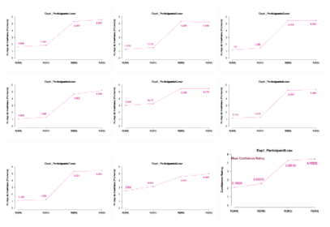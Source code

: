 \begin{figure}[th]
\centering
\includegraphics[width=0.30\textwidth]{Figures/MirrorRating_Exp1_P1} \includegraphics[width=0.30\textwidth]{Figures/MirrorRating_Exp1_P2} \includegraphics[width=0.30\textwidth]{Figures/MirrorRating_Exp1_P3}
\includegraphics[width=0.30\textwidth]{Figures/MirrorRating_Exp1_P4} \includegraphics[width=0.30\textwidth]{Figures/MirrorRating_Exp1_P5} \includegraphics[width=0.30\textwidth]{Figures/MirrorRating_Exp1_P6}
\includegraphics[width=0.30\textwidth]{Figures/MirrorRating_Exp1_P7} \includegraphics[width=0.30\textwidth]{Figures/MirrorRating_Exp1_P8} \includegraphics[width=0.30\textwidth]{Figures/MirrorRating_Exp1_P9}

\end{figure}

